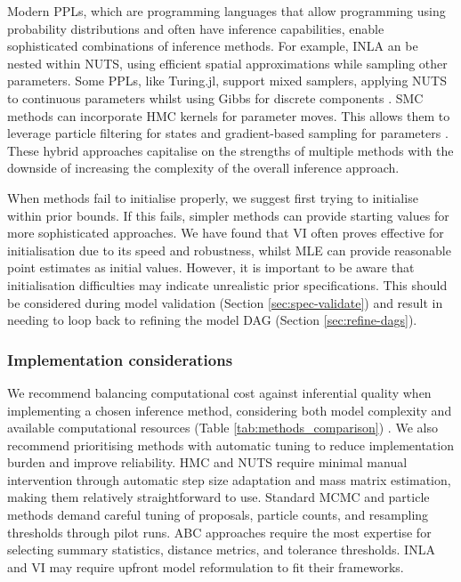 \documentclass{article}
\begin{document}
Modern \ac{PPL}s, which are programming languages that allow programming using probability distributions and often have inference capabilities, enable sophisticated combinations of inference methods.
For example, \ac{INLA} an be nested within \ac{NUTS}, using efficient spatial approximations while sampling other parameters.
Some \ac{PPL}s, like Turing.jl, support mixed samplers, applying \ac{NUTS} to continuous parameters whilst using Gibbs for discrete components \citet{fjelde2025turing}.
\ac{SMC} methods can incorporate \ac{HMC} kernels for parameter moves.
This allows them to leverage particle filtering for states and gradient-based sampling for parameters \citet{buchholz2021adaptive, devlin2024no, rosato2024enhanced}.
These hybrid approaches capitalise on the strengths of multiple methods with the downside of increasing the complexity of the overall inference approach.

When methods fail to initialise properly, we suggest first trying to initialise within prior bounds.
If this fails, simpler methods can provide starting values for more sophisticated approaches.
We have found that \ac{VI} often proves effective for initialisation due to its speed and robustness, whilst \ac{MLE} can provide reasonable point estimates as initial values.
However, it is important to be aware that initialisation difficulties may indicate unrealistic prior specifications.
This should be considered during model validation (Section \ref{sec:spec-validate}) and result in needing to loop back to refining the model \ac{DAG} (Section \ref{sec:refine-dags}).

\subsubsection{Implementation considerations}

We recommend balancing computational cost against inferential quality when implementing a chosen inference method, considering both model complexity and available computational resources (Table \ref{tab:methods_comparison}) \citep{funk2020choices}.
We also recommend prioritising methods with automatic tuning to reduce implementation burden and improve reliability.
\ac{HMC} and \ac{NUTS} require minimal manual intervention through automatic step size adaptation and mass matrix estimation, making them relatively straightforward to use.
Standard \ac{MCMC} and particle methods demand careful tuning of proposals, particle counts, and resampling thresholds through pilot runs.
\ac{ABC} approaches require the most expertise for selecting summary statistics, distance metrics, and tolerance thresholds.
\ac{INLA} and \ac{VI} may require upfront model reformulation to fit their frameworks.
\end{document}

